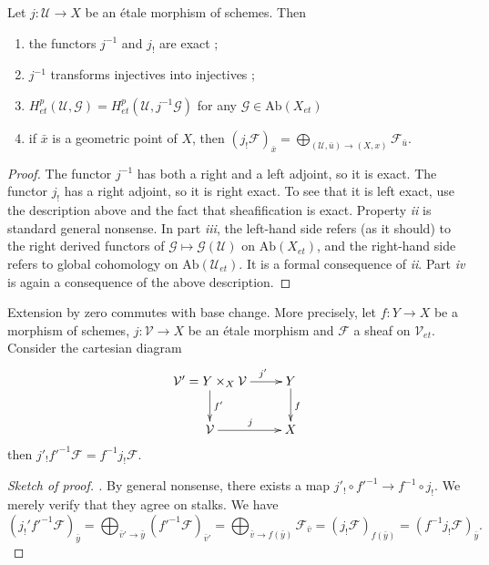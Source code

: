 \begin{proposition}
\label{proposition-describe-jshriek}
Let $j : \mathcal{U} \to X$ be an \'etale morphism of schemes. Then
\begin{enumerate}
\item the functors $j^{-1}$ and $j_!$ are exact ;
\item $j^{-1}$ transforms injectives into injectives ;
\item $H_{et}^p(\mathcal{U}, \mathcal{G})= H_{et}^p(\mathcal{U},
j^{-1}\mathcal{G})$ for any $\mathcal{G} \in \text{Ab}(X_{et})$
\item if $\bar x$ is a geometric point of $X$, then
$\left(j_!\mathcal{F}\right)_{\bar x} =\displaystyle \bigoplus_{(\mathcal{U},
\bar u) \to (X, x)} \mathcal{F}_{\bar{u}}$.
\end{enumerate}
\end{proposition}

\begin{proof}
The functor $j^{-1}$ has both a right and a left adjoint, so it is exact. The
functor $j_!$ has a right adjoint, so it is right exact. To see that it is left
exact, use the description above and the fact that sheafification is exact.
Property {\it ii} is standard general nonsense. In part {\it iii}, the
left-hand side refers (as it should) to the right derived functors of
$\mathcal{G}\mapsto \mathcal{G}(\mathcal{U})$ on $\text{Ab}(X_{et})$, and the
right-hand side refers to global cohomology on $\text{Ab}(\mathcal{U}_{et})$.
It is a formal consequence of {\it ii}. Part {\it iv} is again a consequence of
the above description.
\end{proof}

\begin{lemma}
\label{lemma-shriek-base-change}
Extension by zero commutes with base change. More precisely, let $f: Y \to X$
be a morphism of schemes, $j: \mathcal{V} \to X$ be an \'etale morphism and
$\mathcal{F}$ a sheaf on $\mathcal{V}_{et}$. Consider the cartesian diagram
$$
\xymatrix{
{\mathcal{V}'=Y\times_X \mathcal{V}} \ar^{f'}[d] \ar^{\qquad j'}[r] & {Y}
\ar^{f}[d] \\
{\mathcal{V}} \ar^{j}[r] & {X}
}
$$
then $j'_! f'^{-1}\mathcal{F} = f^{-1}j_!\mathcal{F}$.
\end{lemma}

\begin{proof}[Sketch of proof. ]
By general nonsense, there exists a map $j'_! \circ f'^{-1} \to f^{-1}\circ
j_!$. We merely verify that they agree on stalks. We have
$$
\left(j_!'f'^{-1}\mathcal{F}\right)_{\bar y} =
\bigoplus_{\bar v' \to \bar y} (f'^{-1}\mathcal{F})_{\bar v'} =
\bigoplus_{\bar v \to f(\bar y)} \mathcal{F}_{\bar v} =
(j_!\mathcal{F})_{f(\bar y)} =
(f^{-1}j_!\mathcal{F})_{\bar y}.
$$
\end{proof}

